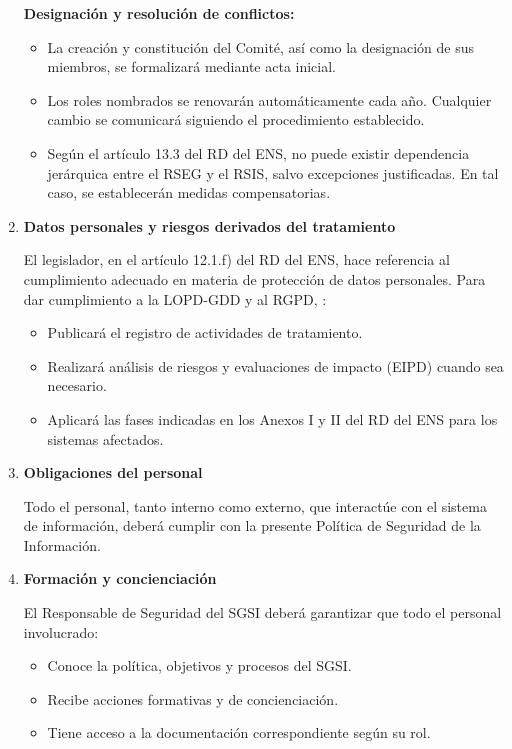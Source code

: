 \begin{enumerate}[label=\alph*)]
\textbf{Designación y resolución de conflictos:}
\begin{itemize}
  \item La creación y constitución del Comité, así como la designación de sus miembros, se formalizará mediante acta inicial.
  \item Los roles nombrados se renovarán automáticamente cada año. Cualquier cambio se comunicará siguiendo el procedimiento establecido.
  \item Según el artículo 13.3 del RD del ENS, no puede existir dependencia jerárquica entre el RSEG y el RSIS, salvo excepciones justificadas. En tal caso, se establecerán medidas compensatorias.
\end{itemize}

\item \textbf{Datos personales y riesgos derivados del tratamiento}

El legislador, en el artículo 12.1.f) del RD del ENS, hace referencia al cumplimiento adecuado en materia de protección de datos personales. Para dar cumplimiento a la LOPD-GDD y al RGPD, \Beneficiario{}:

\begin{itemize}
  \item Publicará el registro de actividades de tratamiento.
  \item Realizará análisis de riesgos y evaluaciones de impacto (EIPD) cuando sea necesario.
  \item Aplicará las fases indicadas en los Anexos I y II del RD del ENS para los sistemas afectados.
\end{itemize}

\item \textbf{Obligaciones del personal}

Todo el personal, tanto interno como externo, que interactúe con el sistema de información, deberá cumplir con la presente Política de Seguridad de la Información.

\item \textbf{Formación y concienciación}

El Responsable de Seguridad del SGSI deberá garantizar que todo el personal involucrado:

\begin{itemize}
  \item Conoce la política, objetivos y procesos del SGSI.
  \item Recibe acciones formativas y de concienciación.
  \item Tiene acceso a la documentación correspondiente según su rol.
\end{itemize}


\end{enumerate}
